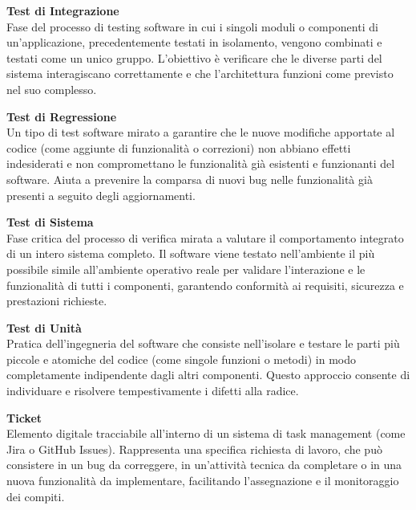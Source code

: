 \documentclass[12pt, a4paper]{article}
\begin{document}
\noindent\hypertarget{test-di-integrazione}{\textbf{Test di Integrazione}} \\[0.1em]
Fase del processo di testing software in cui i singoli moduli o componenti di un'applicazione, precedentemente testati in isolamento, vengono combinati e testati come un unico gruppo. L'obiettivo è verificare che le diverse parti del sistema interagiscano correttamente e che l'architettura funzioni come previsto nel suo complesso.
\vspace{0.5cm}

\noindent\hypertarget{test-di-regressione}{\textbf{Test di Regressione}} \\[0.1em]
Un tipo di test software mirato a garantire che le nuove modifiche apportate al codice (come aggiunte di funzionalità o correzioni) non abbiano effetti indesiderati e non compromettano le funzionalità già esistenti e funzionanti del software. Aiuta a prevenire la comparsa di nuovi bug nelle funzionalità già presenti a seguito degli aggiornamenti.
\vspace{0.5cm}

\noindent\hypertarget{test-di-sistema}{\textbf{Test di Sistema}} \\[0.1em]
Fase critica del processo di verifica mirata a valutare il comportamento integrato di un intero sistema completo. Il software viene testato nell'ambiente il più possibile simile all'ambiente operativo reale per validare l'interazione e le funzionalità di tutti i componenti, garantendo conformità ai requisiti, sicurezza e prestazioni richieste.
\vspace{0.5cm}

\noindent\hypertarget{test-di-unita}{\textbf{Test di Unità}} \\[0.1em]
Pratica dell'ingegneria del software che consiste nell'isolare e testare le parti più piccole e atomiche del codice (come singole funzioni o metodi) in modo completamente indipendente dagli altri componenti. Questo approccio consente di individuare e risolvere tempestivamente i difetti alla radice.
\vspace{0.5cm}

\noindent\hypertarget{ticket}{\textbf{Ticket}} \\[0.1em]
Elemento digitale tracciabile all'interno di un sistema di task management (come Jira o GitHub Issues). Rappresenta una specifica richiesta di lavoro, che può consistere in un bug da correggere, in un'attività tecnica da completare o in una nuova funzionalità da implementare, facilitando l'assegnazione e il monitoraggio dei compiti.
\vspace{0.5cm}
\end{document}
